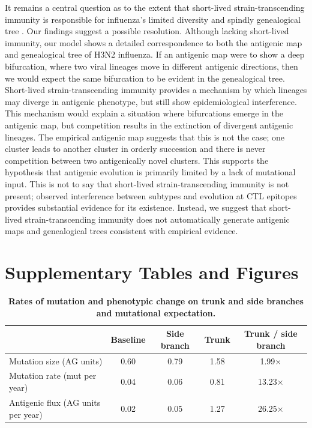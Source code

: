 It remains a central question as to the extent that short-lived strain-transcending immunity is responsible for influenza's limited diversity and spindly genealogical tree \cite{Ferguson03,Tria05}.  Our findings suggest a possible resolution.  Although lacking short-lived immunity, our model shows a detailed correspondence to both the antigenic map and genealogical tree of H3N2 influenza.  If an antigenic map were to show a deep bifurcation, where two viral lineages move in different antigenic directions, then we would expect the same bifurcation to be evident in the genealogical tree.  Short-lived strain-transcending immunity provides a mechanism by which lineages may diverge in antigenic phenotype, but still show epidemiological interference.  This mechanism would explain a situation where bifurcations emerge in the antigenic map, but competition results in the extinction of divergent antigenic lineages.  The empirical antigenic map \cite{Smith04} suggests that this is not the case; one cluster leads to another cluster in orderly succession and there is never competition between two antigenically novel clusters.  This supports the hypothesis that antigenic evolution is primarily limited by a lack of mutational input.  This is not to say that short-lived strain-transcending immunity is not present; observed interference between subtypes \cite{Ferguson03,Goldstein11} and evolution at CTL epitopes \cite{Voeten00} provides substantial evidence for its existence.  Instead, we suggest that short-lived strain-transcending immunity does not automatically generate antigenic maps and genealogical trees consistent with empirical evidence.


\vspace{1cm}

\pagebreak

\section*{Supplementary Tables and Figures}

\begin{table}[h]
	\centering
	\caption{\textbf{Rates of mutation and phenotypic change on trunk and side branches and mutational expectation.}}
	\label{mktable}
	\begin{tabular}{ l c c c c } 
	\hline
		 								& Baseline 	& Side branch 	& Trunk		& Trunk / side branch \\
	\hline				
	Mutation size (AG units)			& 0.60		& 0.79			& 1.58		& 1.99$\times$ \\
	Mutation rate (mut per year)		& 0.04		& 0.06			& 0.81		& 13.23$\times$ \\	
	Antigenic flux (AG units per year)	& 0.02		& 0.05			& 1.27		& 26.25$\times$ \\		
	\hline
	\end{tabular}
\end{table}

